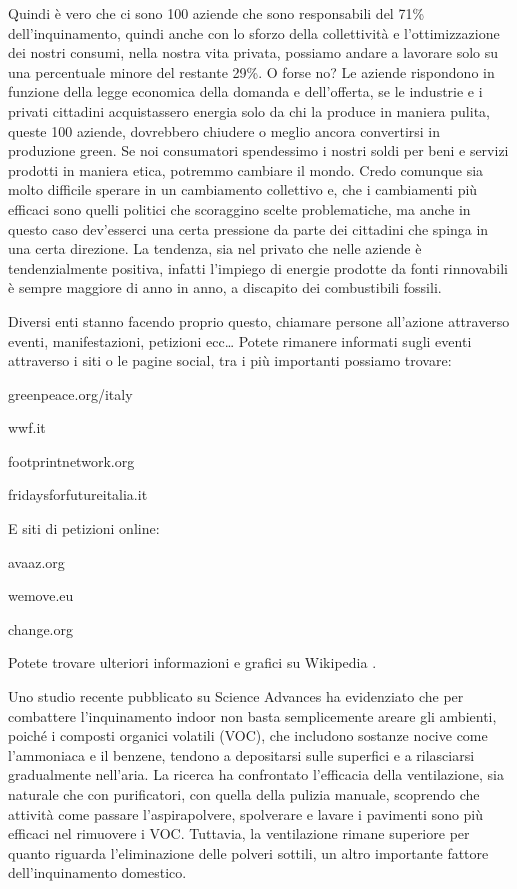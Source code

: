 \documentclass[12pt]{book} %
\begin{document}
Quindi è vero che ci sono 100 aziende che sono responsabili del 71\% dell'inquinamento, quindi
anche con lo sforzo della collettività e l'ottimizzazione dei nostri consumi, nella nostra vita
privata, possiamo andare a lavorare solo su una percentuale minore del restante 29\%. O forse no? Le aziende rispondono
in funzione della legge economica della domanda e dell'offerta, se le industrie e i privati
cittadini acquistassero energia solo da chi la produce in maniera pulita, queste 100 aziende, dovrebbero chiudere o
meglio ancora convertirsi in produzione green. Se noi consumatori
spendessimo i nostri soldi per beni e servizi prodotti in maniera etica, potremmo cambiare il mondo.
Credo comunque sia molto difficile sperare in un cambiamento collettivo e, che i cambiamenti più efficaci sono quelli politici che scoraggino scelte problematiche, ma anche in questo caso dev'esserci una certa pressione da parte dei cittadini che spinga in una certa direzione.
La tendenza, sia nel privato che nelle aziende è tendenzialmente positiva, infatti l'impiego di energie prodotte da fonti
rinnovabili è sempre maggiore di anno in anno, a discapito dei combustibili fossili.

Diversi enti stanno facendo proprio questo, chiamare persone all'azione attraverso eventi,
manifestazioni, petizioni ecc… Potete rimanere informati sugli eventi attraverso i siti o le pagine social, tra i più
importanti possiamo trovare:

greenpeace.org/italy

wwf.it

footprintnetwork.org

fridaysforfutureitalia.it 



E siti di petizioni online:

avaaz.org

wemove.eu

change.org


Potete trovare ulteriori informazioni e grafici su
Wikipedia
.


\begin{mdframed}[linewidth=1pt]
Uno studio recente pubblicato su Science Advances ha evidenziato che per combattere l’inquinamento indoor non basta semplicemente areare gli ambienti, poiché i composti organici volatili (VOC), che includono sostanze nocive come l’ammoniaca e il benzene, tendono a depositarsi sulle superfici e a rilasciarsi gradualmente nell’aria. La ricerca ha confrontato l’efficacia della ventilazione, sia naturale che con purificatori, con quella della pulizia manuale, scoprendo che attività come passare l’aspirapolvere, spolverare e lavare i pavimenti sono più efficaci nel rimuovere i VOC. Tuttavia, la ventilazione rimane superiore per quanto riguarda l’eliminazione delle polveri sottili, un altro importante fattore dell’inquinamento domestico.
\end{mdframed}
\end{document}
